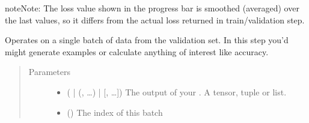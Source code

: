 \documentclass[letterpaper,10pt,english]{sphinxmanual}
\begin{document}
\begin{fulllineitems}
\begin{fulllineitems}
\begin{sphinxadmonition}{note}{Note:}
\sphinxAtStartPar
The loss value shown in the progress bar is smoothed (averaged) over the last values,
so it differs from the actual loss returned in train/validation step.
\end{sphinxadmonition}

\end{fulllineitems}


\begin{fulllineitems}
\label{\detokenize{pages/ml:vipercore.ml.plmodels.GeneralModel.validation_step}}
\sphinxAtStartPar
Operates on a single batch of data from the validation set.
In this step you’d might generate examples or calculate anything of interest like accuracy.

\begin{sphinxVerbatim}[commandchars=\\\{\}]
  \PYG{p}{[}\PYG{p}{]}
   
      
\end{sphinxVerbatim}
\begin{quote}\begin{description}
\item[{Parameters}] \leavevmode\begin{itemize}
\item {} 
\sphinxAtStartPar
{} ( | (, …) | {[}, …{]}) \textendash{} The output of your . A tensor, tuple or list.

\item {} 
\sphinxAtStartPar
{} () \textendash{} The index of this batch


\end{itemize}
\end{description}
\end{quote}
\end{fulllineitems}
\end{fulllineitems}
\end{document}
